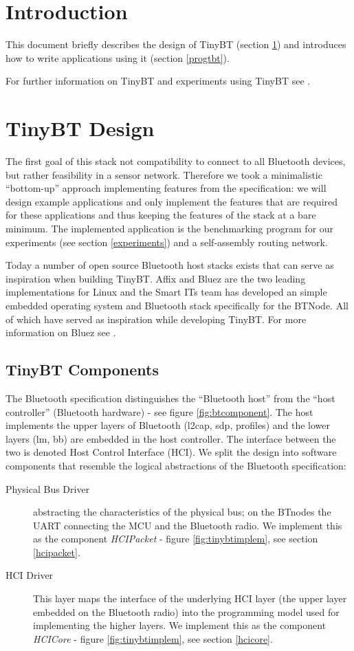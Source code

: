 \documentclass[a4paper,10pt]{article}
\begin{document}
\section*{Introduction}
This document briefly describes the design of TinyBT (section
\ref{tinybt}) and introduces how to write applications using it
(section \ref{progtbt}).

For further information on TinyBT and experiments using TinyBT see
\cite{leo03bluetooth}.

\section{TinyBT Design}
\label{tinybt}
The first goal of this stack not compatibility to connect to all
Bluetooth devices, but rather feasibility in a sensor network.
Therefore we took a minimalistic ``bottom-up'' approach implementing
features from the specification: we will design example applications
and only implement the features that are required for these
applications and thus keeping the features of the stack at a bare
minimum. The implemented application is the benchmarking program for
our experiments (see section \ref{experiments}) and a self-assembly
routing network.

Today a number of open source Bluetooth host stacks exists that can
serve as inspiration when building TinyBT. Affix and Bluez are the two
leading implementations for Linux and the Smart ITs team has developed
an simple embedded operating system and Bluetooth stack specifically
for the BTNode. All of which have served as inspiration while
developing TinyBT. For more information on Bluez see \cite{ML02}.

\subsection{TinyBT Components}
The Bluetooth specification distinguishes the ``Bluetooth host'' from
the ``host controller'' (Bluetooth hardware) - see figure
\ref{fig:btcomponent}. The host implements the upper layers of
Bluetooth (l2cap, sdp, profiles) and the lower layers (lm, bb) are
embedded in the host controller. The interface between the two is
denoted Host Control Interface (HCI). We split the design into
software components that resemble the logical abstractions of the
Bluetooth specification:

\begin{description}
\item [Physical Bus Driver] abstracting the characteristics of the
  physical bus; on the BTnodes the UART connecting the MCU and the
  Bluetooth radio. We implement this as the component \emph{HCIPacket}
  - figure \ref{fig:tinybtimplem}, see section \ref{hcipacket}.
\item [HCI Driver] This layer maps the interface of the underlying HCI
  layer (the upper layer embedded on the Bluetooth radio) into the
  programming model used for implementing the higher layers. We
  implement this as the component \emph{HCICore} - figure
  \ref{fig:tinybtimplem}, see section \ref{hcicore}.
\end{description}
\end{document}
